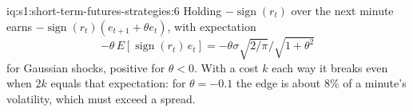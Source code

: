 \begin{solution}{iq:s1:short-term-futures-strategies:6}
Holding $-\operatorname{sign}(r_t)$ over the next minute earns $-\operatorname{sign}(r_t)(e_{t+1} + \theta e_t)$, with expectation
\[
-\theta\,E[\operatorname{sign}(r_t)\,e_t] = -\theta\sigma\sqrt{2/\pi}\big/\sqrt{1 + \theta^2}
\]
for Gaussian shocks, positive for $\theta < 0$. With a cost $k$ each way it breaks even when $2k$ equals that expectation: for $\theta = -0.1$ the edge
is about 8\% of a minute's volatility, which must exceed a spread.
\end{solution}
